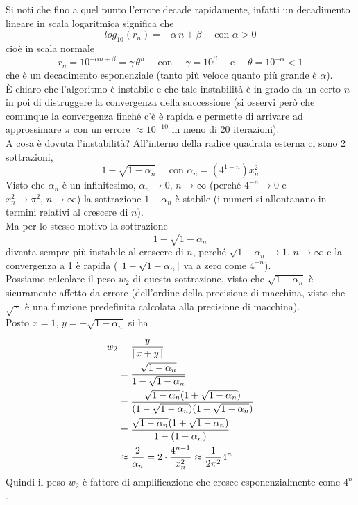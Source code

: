 Si noti che fino a quel punto l'errore decade rapidamente, infatti un decadimento lineare in scala logaritmica significa che 
\[ log_{10}(r_n)=-\alpha\,n+\beta \quad \text{ con } \alpha >0 \] 
cioè in scala normale 
\[r_n=10^{-\alpha n+\beta}=\gamma\,\theta^n \quad \text{ con } \quad \gamma=10^{\beta} \quad \text{ e } \quad \theta=10^{-\alpha}< 1 \] 
che è un decadimento esponenziale (tanto più veloce quanto più grande è $\alpha$).\\
È chiaro che l'algoritmo è instabile e che tale instabilità è in grado da un certo $n$ in poi di distruggere la convergenza della successione (si osservi però che comunque la convergenza finché c'è è rapida e permette di arrivare ad approssimare $\pi$ con un errore $\approx10^{-10}$ in meno di 20 iterazioni).\\ 
A cosa è dovuta l'instabilità? All'interno della radice quadrata esterna ci sono 2 sottrazioni, 
\[ 1-\sqrt{1-\alpha_n} \quad \text{ con } \alpha_n=(4^{1-n})x^{2}_n \]
Visto che $\alpha_n$ è un infinitesimo, $\alpha_n \to 0,\, n\to\infty$ (perché $4^{-n}\to 0$ e $x^{2}_n\to\pi^2,\, n\to\infty$) la sottrazione $1-\alpha_n$ è stabile (i numeri si allontanano in termini relativi al crescere di $n$).\\ 
Ma per lo stesso motivo la sottrazione 
\[ 1-\sqrt{1-\alpha_n} \] 
diventa sempre più instabile al crescere di $n$, perché $\sqrt{1-\alpha_n}\to1$, $n\rightarrow\infty$ e la convergenza a 1 è rapida ($\lvert\,1-\sqrt{1-\alpha_n}\,\rvert$ va a zero come $4^{-n}$).\\
Possiamo calcolare il peso $w_2$ di questa sottrazione, visto che $\sqrt{1-\alpha_n}$ è sicuramente affetto da errore (dell'ordine della precisione di macchina, visto che $\sqrt{\,\cdot\,}$ è una funzione predefinita calcolata alla precisione di macchina).\\ 
Posto $x=1,\, y=-\sqrt{1-\alpha_n}$ si ha\\
\[\begin{split}
    w_2 & = \frac{\lvert\,y\,\rvert}{\lvert\,x+y\,\rvert} \\
    & = \frac{\sqrt{1-\alpha_n}}{1-\sqrt{1-\alpha_n}} \\
    & = \frac{\sqrt{1-\alpha_n}(1+\sqrt{1-\alpha_n})}{(1-\sqrt{1-\alpha_n})(1+\sqrt{1-\alpha_n})} \\
    & =\frac{\sqrt{1-\alpha_n}(1+\sqrt{1-\alpha_n})}{1-(1-\alpha_n)} \\
    & \approx\frac{2}{\alpha_n}=2\cdot\frac{4^{n-1}}{x^{2}_n}\approx\frac{1}{2\pi^2}4^n
\end{split}\]
Quindi il peso $ w_2 $ è fattore di amplificazione che cresce esponenzialmente come $ 4^n $.\\
